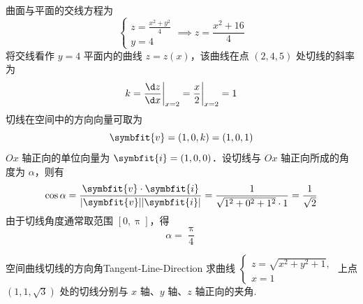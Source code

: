 \begin{solution}
    曲面与平面的交线方程为
    \begin{equation}
        \begin{cases}
            z = \frac{x^2+y^2}{4} \\
            y = 4
        \end{cases} \implies z = \frac{x^2+16}{4}
    \end{equation}
    将交线看作 $y=4$ 平面内的曲线 $z = z(x)$，该曲线在点 $(2, 4, 5)$ 处切线的斜率为
    \begin{equation}
        k = \frac{\d z}{\d x} \bigg|_{x=2} = \frac{x}{2} \bigg|_{x=2} = 1
    \end{equation}
    切线在空间中的方向向量可取为
    \begin{equation}
        \symbfit{v} = (1, 0, k) = (1, 0, 1)
    \end{equation}
    $Ox$ 轴正向的单位向量为 $\symbfit{i} = (1, 0, 0)$．设切线与 $Ox$ 轴正向所成的角度为 $\alpha$，则有
    \begin{equation}
        \cos \alpha = \frac{\symbfit{v} \cdot \symbfit{i}}{|\symbfit{v}| |\symbfit{i}|} = \frac{1}{\sqrt{1^2 + 0^2 + 1^2} \cdot 1} = \frac{1}{\sqrt{2}}
    \end{equation}
    由于切线角度通常取范围 $[0, \uppi]$，得
    \begin{equation}
        \boxed{\alpha = \frac{\uppi}{4}}
    \end{equation}
\end{solution}


\begin{problem}{空间曲线切线的方向角}{Tangent-Line-Direction}
    求曲线 $\begin{cases} z = \sqrt{x^2 + y^2 + 1}, \\ x = 1 \end{cases}$ 上点 $(1, 1, \sqrt{3})$ 处的切线分别与 $x$ 轴、$y$ 轴、$z$ 轴正向的夹角.
\end{problem}

